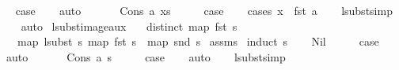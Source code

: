 \begin{isabellebody}
\ \isamarkupfalse%
\ {\isacharquery}{\kern0pt}case\isanewline
\ \ \isamarkupfalse%
\ auto\isanewline
\ \ \isamarkupfalse%
\isanewline
{}\isamarkupfalse%
\isanewline
\ \ \isamarkupfalse%
\ {\isacharparenleft}{\kern0pt}Cons\ a\ xs{\isacharparenright}{\kern0pt}\isanewline
\ \ \isamarkupfalse%
\ \isamarkupfalse%
\ {\isacharquery}{\kern0pt}case\isanewline
\ \ \isamarkupfalse%
\ {\isacharparenleft}{\kern0pt}cases\ {\isachardoublequoteopen}x\ {\isacharequal}{\kern0pt}\ fst\ a{\isachardoublequoteclose}{\isacharparenright}{\kern0pt}\isanewline
\ \ \isamarkupfalse%
\ lsubst{\isacharunderscore}{\kern0pt}simp\isanewline
\ \ \isamarkupfalse%
\ auto\isanewline
{}\isamarkupfalse%
%
\endisatagproof
{\isafoldproof}%
%
\isadelimproof
\isanewline
%
\endisadelimproof
\isanewline
\isanewline
{}\isamarkupfalse%
\ lsubst{\isacharunderscore}{\kern0pt}image{\isacharunderscore}{\kern0pt}aux{\isacharcolon}{\kern0pt}\isanewline
\ \ \ {\isachardoublequoteopen}distinct\ {\isacharparenleft}{\kern0pt}map\ fst\ s{\isacharparenright}{\kern0pt}{\isachardoublequoteclose}\isanewline
\ \ \ {\isachardoublequoteopen}map\ {\isacharparenleft}{\kern0pt}lsubst\ s{\isacharparenright}{\kern0pt}\ {\isacharparenleft}{\kern0pt}map\ fst\ s{\isacharparenright}{\kern0pt}\ {\isacharequal}{\kern0pt}\ map\ snd\ s{\isachardoublequoteclose}\isanewline
%
\isadelimproof
%
\endisadelimproof
%
\isatagproof
{}\isamarkupfalse%
\ assms\isanewline
{}\isamarkupfalse%
\ {\isacharparenleft}{\kern0pt}induct\ s{\isacharparenright}{\kern0pt}\isanewline
\ \ \isamarkupfalse%
\ Nil\isanewline
\ \ \isamarkupfalse%
\ \isamarkupfalse%
\ {\isacharquery}{\kern0pt}case\isanewline
\ \ \isamarkupfalse%
\ auto\isanewline
\ \ \isamarkupfalse%
\isanewline
{}\isamarkupfalse%
\isanewline
\ \ \isamarkupfalse%
\ {\isacharparenleft}{\kern0pt}Cons\ a\ s{\isacharparenright}{\kern0pt}\isanewline
\ \ \isamarkupfalse%
\ \isamarkupfalse%
\ {\isacharquery}{\kern0pt}case\isanewline
\ \ \isamarkupfalse%
\ auto\isanewline
\ \ \isamarkupfalse%
\ lsubst{\isacharunderscore}{\kern0pt}simp\ \isamarkupfalse%

\end{isabellebody}
